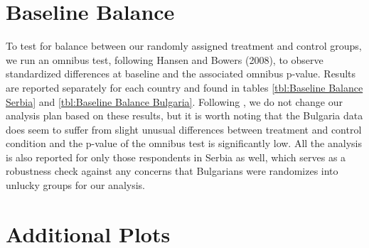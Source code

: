 \documentclass{article}
\begin{document}
\printbibliography

\appendix



\section{Baseline Balance}

To test for balance between our randomly assigned treatment and control groups, we run an omnibus test, following Hansen and Bowers (2008), to observe standardized differences at baseline and the associated omnibus p-value. Results are reported separately for each country and found in tables \ref{tbl:Baseline Balance Serbia} and \ref{tbl:Baseline Balance Bulgaria}. Following \cite{Altman2014}, we do not change our analysis plan based on these results, but it is worth noting that the Bulgaria data does seem to suffer from slight unusual differences between treatment and control condition and the p-value of the omnibus test is significantly low. All the analysis is also reported for only those respondents in Serbia as well, which serves as a robustness check against any concerns that Bulgarians were randomizes into unlucky groups for our analysis.


% 



\section{Additional Plots}
\end{document}
